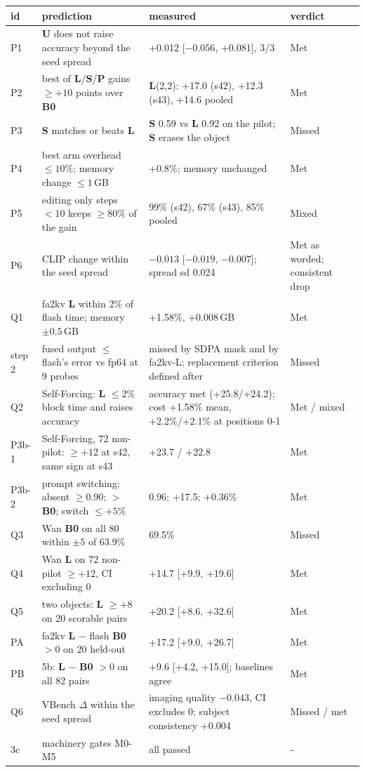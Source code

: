 \documentclass[10pt,a4paper]{article}
\newcommand{\arm}[1]{\textbf{#1}}
\begin{document}
\begin{tabularx}{\textwidth}{lYYl}\toprule
id & prediction & measured & verdict\\\midrule
P1 & \arm{U} does not raise accuracy beyond the seed spread & +0.012 [$-0.056$, +0.081], 3/3 & Met\\
P2 & best of \arm{L}/\arm{S}/\arm{P} gains $\ge+10$ points over \arm{B0} & \arm{L}(2,2): +17.0 (s42), +12.3 (s43), +14.6 pooled & Met\\
P3 & \arm{S} matches or beats \arm{L} & \arm{S} 0.59 vs \arm{L} 0.92 on the pilot; \arm{S} erases the object & Missed\\
P4 & best arm overhead $\le10\%$; memory change $\le1$\,GB & +0.8\%; memory unchanged & Met\\
P5 & editing only steps $<10$ keeps $\ge80\%$ of the gain & 99\% (s42), 67\% (s43), 85\% pooled & Mixed\\
P6 & CLIP change within the seed spread & $-0.013$ [$-0.019$, $-0.007$]; spread sd 0.024 & Met as worded; consistent drop\\
Q1 & fa2kv \arm{L} within 2\% of flash time; memory $\pm0.5$\,GB & +1.58\%, +0.008\,GB & Met\\
step 2 & fused output $\le$ flash's error vs fp64 at 9 probes & missed by SDPA mask and by fa2kv-L; replacement criterion defined after & Missed\\
Q2 & Self-Forcing: \arm{L} $\le2\%$ block time and raises accuracy & accuracy met (+25.8/+24.2); cost +1.58\% mean, +2.2\%/+2.1\% at positions 0-1 & Met / mixed\\
P3b-1 & Self-Forcing, 72 non-pilot: $\ge+12$ at s42, same sign at s43 & +23.7 / +22.8 & Met\\
P3b-2 & prompt switching: absent $\ge0.90$; $>$ \arm{B0}; switch $\le+5\%$ & 0.96; +17.5; +0.36\% & Met\\
Q3 & Wan \arm{B0} on all 80 within $\pm5$ of 63.9\% & 69.5\% & Missed\\
Q4 & Wan \arm{L} on 72 non-pilot $\ge+12$, CI excluding 0 & +14.7 [+9.9, +19.6] & Met\\
Q5 & two objects: \arm{L} $\ge+8$ on 20 scorable pairs & +20.2 [+8.6, +32.6] & Met\\
PA & fa2kv \arm{L} $-$ flash \arm{B0} $>0$ on 20 held-out & +17.2 [+9.0, +26.7] & Met\\
PB & 5b: \arm{L} $-$ \arm{B0} $>0$ on all 82 pairs & +9.6 [+4.2, +15.0]; baselines agree & Met\\
Q6 & VBench $\Delta$ within the seed spread & imaging quality $-0.043$, CI excludes 0; subject consistency +0.004 & Missed / met\\
3c & machinery gates M0-M5 & all passed & - \\
\bottomrule\end{tabularx}
\end{document}

